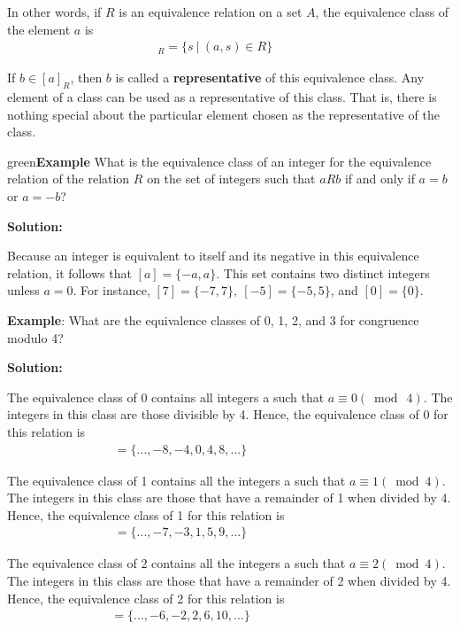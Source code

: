 \documentclass[11pt]{article}
\newenvironment{example}[1][\unskip]{\begin{mybox}{green}{\textbf{Example} {#1}}}{\end{mybox}}
\begin{document}
\noindent In other words, if $R$ is an equivalence relation on a set $A$, the equivalence class of the element $a$ is
\begin{align*}
    [a]_R = \{s\ |\ (a, s) \in R\} & & &    
\end{align*}

\noindent If $b \in [a]_R$, then $b$ is called a \textbf{representative} of this equivalence class. Any element of a class can be used as a representative of this class. That is, there is nothing special about the particular
element chosen as the representative of the class.

\begin{example}
What is the equivalence class of an integer for the equivalence relation of the relation $R$ on the set of integers such that $a R b$ if and only if $a = b$ or $a = -b$?

\textbf{Solution:}

Because an integer is equivalent to itself and its negative in this equivalence relation, it follows that $[a] = \{-a, a\}$. This set contains two distinct integers unless $a = 0$. For instance, $[7] = \{-7, 7\},\ [-5] = \{-5, 5\}$, and $[0] = \{0\}$.
\end{example}

\noindent \textbf{Example}: What are the equivalence classes of 0, 1, 2, and 3 for congruence modulo 4?

\noindent \textbf{Solution:}

The equivalence class of 0 contains all integers a such that $a \equiv 0 (\bmod{\ 4})$. The integers in this class are those divisible by 4. Hence, the equivalence class of 0 for this relation is
\begin{align*}
    [0] = \{..., -8, -4, 0, 4, 8, ...\} & & & & & & & & & &
\end{align*}

The equivalence class of 1 contains all the integers a such that $a \equiv 1 (\bmod{ 4})$. The integers in this class are those that have a remainder of 1 when divided by 4. Hence, the equivalence class of 1 for this relation is
\begin{align*}
    [1] = \{..., -7, -3, 1, 5, 9, ...\} & & & & & & & & & &
\end{align*}

The equivalence class of 2 contains all the integers a such that $a \equiv 2 (\bmod{ 4})$. The integers in this class are those that have a remainder of 2 when divided by 4. Hence, the equivalence class of 2 for this relation is
\begin{align*}
    [2] = \{..., -6, -2, 2, 6, 10, ...\} & & & & & & & & & &
\end{align*}
\end{document}
